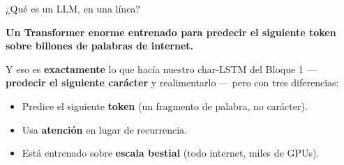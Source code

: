 \documentclass[aspectratio=169, 11pt]{beamer}
\begin{document}
\begin{frame}[shrink]{¿Qué es un LLM, en una línea?}
  \vspace{14pt}
  \begin{center}
  \begin{tcolorbox}[colback=arcaGray, colframe=arcaRed, sharp corners,
    leftrule=4pt, boxrule=0pt, left=14pt, right=14pt, top=8pt, bottom=8pt,
    width=0.88\textwidth]
    {\large\color{arcaDark}\bfseries
    Un Transformer enorme entrenado para \textbf{predecir el siguiente token}\\
    sobre billones de palabras de internet.\par}
  \end{tcolorbox}
  \end{center}
  \vspace{14pt}
  {\footnotesize\color{arcaDark}
  Y eso es \textbf{exactamente} lo que hacía nuestro char-LSTM del Bloque 1 ---
  \textbf{predecir el siguiente carácter} y realimentarlo --- pero con tres diferencias:}
  \vspace{4pt}
  \begin{itemize}\setlength{\itemsep}{2pt}
    \footnotesize
    \item Predice el siguiente \textbf{token} (un fragmento de palabra, no carácter).
    \item Usa \textbf{atención} en lugar de recurrencia.
    \item Está entrenado sobre \textbf{escala bestial} (todo internet, miles de GPUs).
  \end{itemize}
\end{frame}
\end{document}
